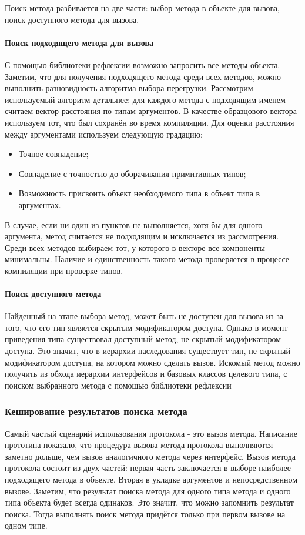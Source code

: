 Поиск метода разбивается на две части: выбор метода в объекте для вызова, поиск доступного метода для вызова.

\paragraph{Поиск подходящего метода для вызова}
С помощью библиотеки рефлексии возможно запросить все методы объекта. Заметим, что для получения подходящего метода среди всех методов, можно выполнить разновидность алгоритма выбора перегрузки. Рассмотрим используемый алгоритм детальнее: для каждого метода с подходящим именем считаем вектор расстояния по типам аргументов. В качестве образцового вектора используем тот, что был сохранён во время компиляции. Для оценки расстояния между аргументами используем следующую градацию:

\begin{itemize}
    \item Точное совпадение;
    \item Совпадение с точностью до оборачивания примитивных типов;
    \item Возможность присвоить объект необходимого типа в объект типа в аргументах.
\end{itemize}

В случае, если ни один из пунктов не выполняется, хотя бы для одного аргумента, метод считается не подходящим и исключается из рассмотрения. Среди всех методов выбираем тот, у которого в векторе все компоненты минимальны. Наличие и единственность такого метода проверяется в процессе компиляции при проверке типов.

\paragraph{Поиск доступного метода}
Найденный на этапе выбора метод, может быть не доступен для вызова из-за того, что его тип является скрытым модификатором доступа. Однако в момент приведения типа существовал доступный метод, не скрытый модификатором доступа. Это значит, что в иерархии наследования существует тип, не скрытый модификатором доступа, на котором можно сделать вызов. Искомый метод можно получить из обхода иерархии интерфейсов и базовых классов целевого типа, с поиском выбранного метода с помощью библиотеки рефлексии

\subsubsection{Кеширование результатов поиска метода}
Самый частый сценарий использования протокола - это вызов метода. Написание прототипа показало, что процедура вызова метода протокола выполняются заметно дольше, чем вызов аналогичного метода через интерфейс. Вызов метода протокола состоит из двух частей: первая часть заключается в выборе наиболее подходящего метода в объекте. Вторая в укладке аргументов и непосредственном вызове. Заметим, что результат поиска метода для одного типа метода и одного типа объекта будет всегда одинаков. Это значит, что можно запомнить результат поиска. Тогда выполнять поиск метода придётся только при первом вызове на одном типе.

